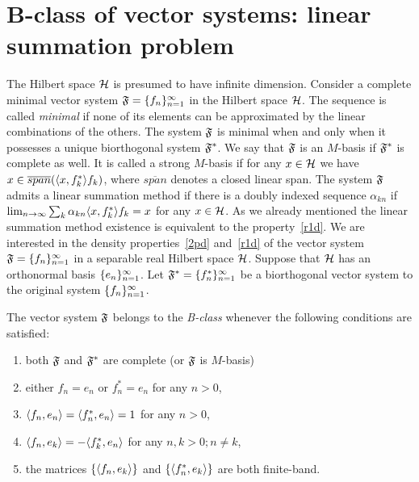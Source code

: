 \documentclass[12pt]{amsart}
\begin{document}
\section{B-class of vector systems: linear summation problem}
    \label{fsys2graphs}
    The Hilbert space $\cal{H}$ is presumed to have infinite dimension.
    Consider a complete minimal vector system $\fsys = \seq{f}$ in the Hilbert space $\cal{H}$.
    The sequence is called \emph{minimal} if none of its elements can be approximated by the linear combinations of the others.
    The system $\fsys$ is minimal when and only when it possesses a unique biorthogonal system $\fstarsys$.
    We say that $\fsys$ is an $M$-basis if $\fstarsys$ is complete as well.
    It is called a strong $M$-basis if for any $x\in\cal{H}$ we have $x \in \overline{span}(\inner{x}{f^*_k}f_k)$, where
      $\overline{span}$ denotes a closed linear span.
    The system $\fsys$ admits a linear summation method if there is a doubly indexed sequence $\alpha_{kn}$ if
      $\lim_{n \to \infty} \sum_k \alpha_{kn} \inner{x}{f^*_k}f_k = x$ for any $x \in \cal{H}$.
    As we already mentioned the linear summation method existence is equivalent to the property~\ref{r1d}.
    We are interested in the density properties~\ref{2pd} and~\ref{r1d} of the vector system $\fsys = \seq{f}$
      in a separable real Hilbert space $\cal{H}$. 
    Suppose that $\cal{H}$ has an orthonormal basis $\seq{e}$.
    Let $\fstarsys = \{f_n^{*}\}_{n=1}^\infty$ be a biorthogonal vector system to the original system $\seq{f}$.
    \begin{definition}
      The vector system $\fsys$ belongs to the \emph{B-class} whenever the following conditions are satisfied:
      \begin{enumerate}[label=\textbf{C\arabic*}]
        \item \label{c1} both $\fsys$ and $\fstarsys$ are complete (or $\fsys$ is $M$-basis)
        \item \label{c2} either $f_n = e_n$ or $f^*_n = e_n$ for any $n > 0$,
        \item \label{c3} $\inner{f_n}{e_n} = \inner{f^*_n}{e_n} = 1$ for any $n > 0$,
        \item \label{c4} $\inner{f_n}{e_k} = -\inner{f^*_k}{e_n}$ for any $n, k > 0; n \neq k$,
        \item \label{c5} the matrices $\{\inner{f_n}{e_k}\}$ and $\{\inner{f^*_n}{e_k}\}$ are both finite-band.
      \end{enumerate}
    \end{definition}
\end{document}
